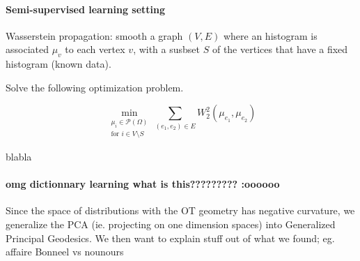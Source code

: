 
\paragraph{Semi-supervised learning setting}

Wasserstein propagation: smooth a graph $(V,E)$ where an histogram is associated
$\mu_v$ to each vertex $v$, with a susbset $S$ of the vertices that have a
fixed histogram (known data).

Solve the following optimization problem.

$$
    \underset{\substack{\mu_i \in \mathcal{P}\left(\Omega\right) \\ \text{for }i \in V\setminus S}}\min \sum_{(e_1, e_2) \in E} W_2^2\left(\mu_{e_1}, \mu_{e_2}\right)
$$

blabla

\paragraph{omg dictionnary learning what is this????????? :oooooo}


Since the space of distributions with the OT geometry has negative curvature,
we generalize the PCA (ie. projecting on one dimension spaces) into Generalized
Principal Geodesics. We then want to explain stuff out of what we found;
eg. affaire Bonneel vs nounours
